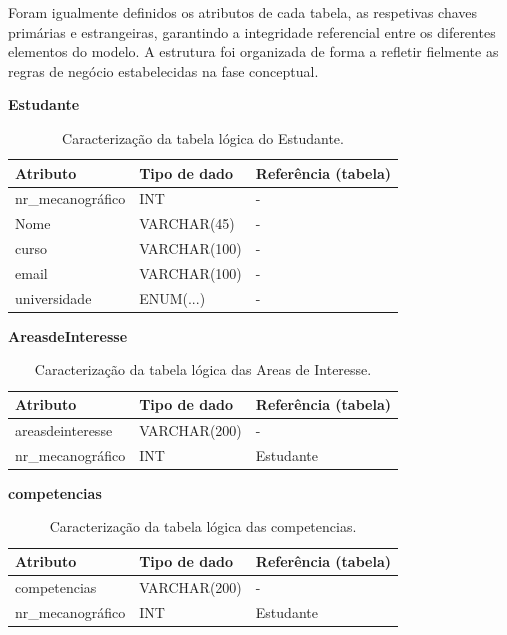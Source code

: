 \documentclass[12pt,a4paper]{article}
\renewcommand{\arraystretch}{1.5}  %
\begin{document}
Foram igualmente definidos os atributos de cada tabela, as respetivas chaves primárias e estrangeiras, garantindo a integridade referencial entre os diferentes elementos do modelo. A estrutura foi organizada de forma a refletir fielmente as regras de negócio estabelecidas na fase conceptual.


\begin{table}[h]
\textbf{Estudante}

\centering
\renewcommand{\arraystretch}{1.2}
\begin{tabularx}{\textwidth}{|X|l|X|}
\hline
\textbf{Atributo} & \textbf{Tipo de dado} & \textbf{Referência (tabela)} \\ \hline

nr\_mecanográfico & INT & - \\ \hline
Nome & VARCHAR(45) & - \\ \hline
curso & VARCHAR(100) & - \\ \hline
email & VARCHAR(100) & - \\ \hline
universidade & ENUM(...) & - \\ \hline
\end{tabularx}
\caption{Caracterização da tabela lógica do Estudante.}
\end{table}


\begin{table}[h]
\textbf{AreasdeInteresse}

\centering
\renewcommand{\arraystretch}{1.2}
\begin{tabularx}{\textwidth}{|X|l|X|}
\hline
\textbf{Atributo} & \textbf{Tipo de dado} & \textbf{Referência (tabela)} \\ \hline
areasdeinteresse & VARCHAR(200) & - \\ \hline
nr\_mecanográfico & INT & Estudante \\ \hline
\end{tabularx}
\caption{Caracterização da tabela lógica das Areas de Interesse.}
\end{table}


\begin{table}[h]
\textbf{competencias}

\centering
\renewcommand{\arraystretch}{1.2}
\begin{tabularx}{\textwidth}{|X|l|X|}
\hline
\textbf{Atributo} & \textbf{Tipo de dado} & \textbf{Referência (tabela)} \\ \hline

competencias & VARCHAR(200) & - \\ \hline
nr\_mecanográfico & INT & Estudante \\ \hline

\end{tabularx}
\caption{Caracterização da tabela lógica das competencias.}
\end{table}
\end{document}
